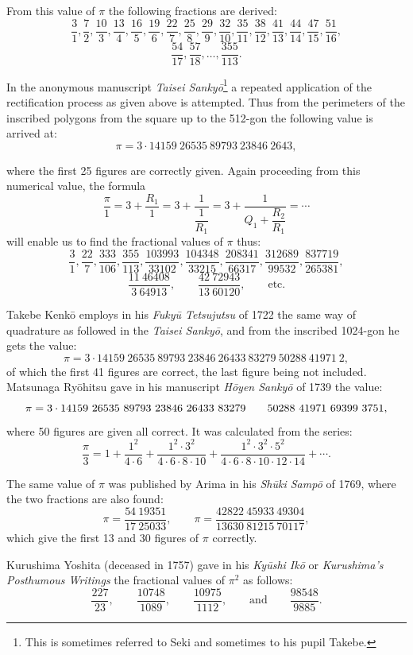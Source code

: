 \documentclass[11pt]{article}
\newcommand{\scanpage}[2]{\clearpage\setcounter{footnote}{0}\noindent{\footnotesize\color{gray}PDF page #1 · #2}\par\medskip}
\newcommand{\scanfooter}{}
\begin{document}
From this value of $\pi$ the following fractions are derived:
\[
\frac31,\frac72,\frac{10}3,\frac{13}4,\frac{16}5,\frac{19}6,\frac{22}7,\frac{25}8,
\frac{29}9,\frac{32}{10},\frac{35}{11},\frac{38}{12},\frac{41}{13},\frac{44}{14},\frac{47}{15},\frac{51}{16},
\]
\[
\frac{54}{17},\frac{57}{18},\ldots,\frac{355}{113}.
\]

In the anonymous manuscript \emph{Taisei Sankyō}\footnote{This is sometimes referred to Seki and sometimes to his pupil Takebe.} a repeated application of the rectification process as given above is attempted. Thus from the perimeters of the inscribed polygons from the square up to the 512-gon the following value is arrived at:
\[
\pi=3\cdot14159\ 26535\ 89793\ 23846\ 2643,
\]
\scanfooter

\scanpage{0216}{Chapter 25, printed page 202}
where the first 25 figures are correctly given. Again proceeding from this numerical value, the formula
\[
\frac{\pi}{1}=3+\frac{R_1}{1}=3+\frac{1}{\dfrac{1}{R_1}}=3+\frac{1}{Q_1+\dfrac{R_2}{R_1}}=\cdots
\]
will enable us to find the fractional values of $\pi$ thus:
\[
\frac31,\frac{22}7,\frac{333}{106},\frac{355}{113},\frac{103993}{33102},\frac{104348}{33215},\frac{208341}{66317},\frac{312689}{99532},\frac{837719}{265381},
\]
\[
\frac{11\ 46408}{3\ 64913},\qquad \frac{42\ 72943}{13\ 60120},\qquad\text{etc.}
\]

Takebe Kenkō employs in his \emph{Fukyū Tetsujutsu} of 1722 the same way of quadrature as followed in the \emph{Taisei Sankyō}, and from the inscribed 1024-gon he gets the value:
\[
\pi=3\cdot14159\ 26535\ 89793\ 23846\ 26433\ 83279\ 50288\ 41971\ 2,
\]
of which the first 41 figures are correct, the last figure being not included. Matsunaga Ryōhitsu gave in his manuscript \emph{Hōyen Sankyō} of 1739 the value:
\[
\pi=3\cdot14159\ 26535\ 89793\ 23846\ 26433\ 83279\\
\phantom{\pi={}}50288\ 41971\ 69399\ 3751,
\]
where 50 figures are given all correct. It was calculated from the series:
\[
\frac{\pi}{3}=1+\frac{1^2}{4\cdot6}+\frac{1^2\cdot3^2}{4\cdot6\cdot8\cdot10}+\frac{1^2\cdot3^2\cdot5^2}{4\cdot6\cdot8\cdot10\cdot12\cdot14}+\cdots.
\]

The same value of $\pi$ was published by Arima in his \emph{Shūki Sampō} of 1769, where the two fractions are also found:
\[
\pi=\frac{54\ 19351}{17\ 25033},\qquad \pi=\frac{42822\ 45933\ 49304}{13630\ 81215\ 70117},
\]
which give the first 13 and 30 figures of $\pi$ correctly.

Kurushima Yoshita (deceased in 1757) gave in his \emph{Kyūshi Ikō} or \emph{Kurushima's Posthumous Writings} the fractional values of $\pi^2$ as follows:
\[
\frac{227}{23},\qquad \frac{10748}{1089},\qquad \frac{10975}{1112},\qquad\text{and}\qquad \frac{98548}{9885}.
\]
\end{document}
